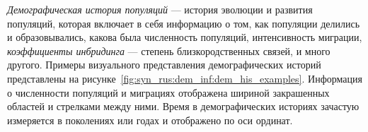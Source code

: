 \emph{Демографическая история популяций} --- история эволюции и развития популяций, которая включает в себя информацию о том, как популяции делились и образовывались, какова была численность популяций, интенсивность миграции, \textit{коэффициенты инбридинга} --- степень близкородственных связей, и много другого.
Примеры визуального представления демографических историй представлены на рисунке~\ref{fig:syn_rus:dem_inf:dem_his_examples}.
Информация о численности популяций и миграциях отображена шириной закрашенных областей и стрелками между ними.
Время в демографических историях зачастую измеряется в поколениях или годах и отображено по оси ординат.
 

